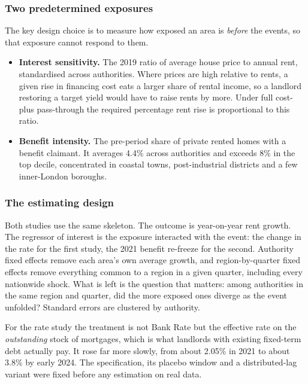 \documentclass[
  british,
  a4paper,
]{article}
\providecommand{\tightlist}{%
  \setlength{\itemsep}{0pt}\setlength{\parskip}{0pt}}
\begin{document}
\subsubsection{Two predetermined
exposures}\label{two-predetermined-exposures}

The key design choice is to measure how exposed an area is \emph{before}
the events, so that exposure cannot respond to them.

\begin{itemize}
\tightlist
\item
  \textbf{Interest sensitivity.} The 2019 ratio of average house price
  to annual rent, standardised across authorities. Where prices are high
  relative to rents, a given rise in financing cost eats a larger share
  of rental income, so a landlord restoring a target yield would have to
  raise rents by more. Under full cost-plus pass-through the required
  percentage rent rise is proportional to this ratio.
\item
  \textbf{Benefit intensity.} The pre-period share of private rented
  homes with a benefit claimant. It averages 4.4\% across authorities
  and exceeds 8\% in the top decile, concentrated in coastal towns,
  post-industrial districts and a few inner-London boroughs.
\end{itemize}

\subsubsection{The estimating design}\label{the-estimating-design}

Both studies use the same skeleton. The outcome is year-on-year rent
growth. The regressor of interest is the exposure interacted with the
event: the change in the rate for the first study, the 2021 benefit
re-freeze for the second. Authority fixed effects remove each area's own
average growth, and region-by-quarter fixed effects remove everything
common to a region in a given quarter, including every nationwide shock.
What is left is the question that matters: among authorities in the same
region and quarter, did the more exposed ones diverge as the event
unfolded? Standard errors are clustered by authority.

For the rate study the treatment is not Bank Rate but the effective rate
on the \emph{outstanding} stock of mortgages, which is what landlords
with existing fixed-term debt actually pay. It rose far more slowly,
from about 2.05\% in 2021 to about 3.8\% by early 2024. The
specification, its placebo window and a distributed-lag variant were
fixed before any estimation on real data.
\end{document}
